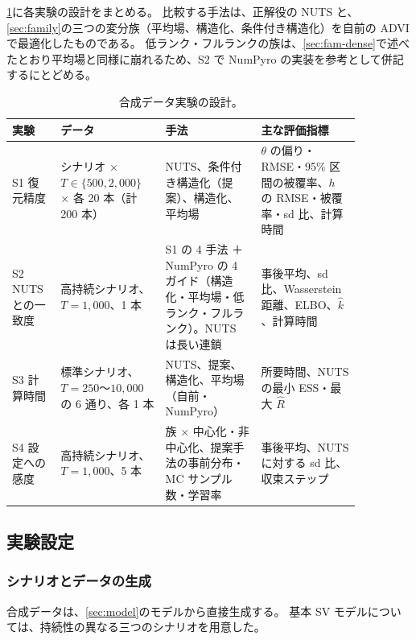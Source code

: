 \cref{tab:syn-design}に各実験の設計をまとめる。
比較する手法は、正解役の NUTS と、\cref{sec:family}の三つの変分族（平均場、構造化、条件付き構造化）を自前の ADVI で最適化したものである。
低ランク・フルランクの族は、\cref{sec:fam-dense}で述べたとおり平均場と同様に崩れるため、S2 で NumPyro の実装を参考として併記するにとどめる。

\begin{table}[tbp]
  \centering
  \caption{合成データ実験の設計。}
  \label{tab:syn-design}
  \footnotesize
  \begin{tabular}{>{\raggedright\arraybackslash}p{0.12\linewidth}>{\raggedright\arraybackslash}p{0.25\linewidth}>{\raggedright\arraybackslash}p{0.24\linewidth}>{\raggedright\arraybackslash}p{0.25\linewidth}}
    \toprule
    実験 & データ & 手法 & 主な評価指標 \\
    \midrule
    S1 復元精度 & 5 シナリオ × $T \in \{500, 2{,}000\}$ × 各 20 本（計 200 本） & NUTS、条件付き構造化（提案）、構造化、平均場 & $\theta$ の偏り・RMSE・95\% 区間の被覆率、$h$ の RMSE・被覆率・sd 比、計算時間 \\
    \addlinespace
    S2 NUTS との一致度 & 高持続シナリオ、$T = 1{,}000$、1 本 & S1 の 4 手法 ＋ NumPyro の 4 ガイド（構造化・平均場・低ランク・フルランク）。NUTS は長い連鎖 & 事後平均、sd 比、Wasserstein 距離、ELBO、$\hat k$、計算時間 \\
    \addlinespace
    S3 計算時間 & 標準シナリオ、$T = 250$〜$10{,}000$ の 6 通り、各 1 本 & NUTS、提案、構造化、平均場（自前・NumPyro） & 所要時間、NUTS の最小 ESS・最大 $\hat R$ \\
    \addlinespace
    S4 設定への感度 & 高持続シナリオ、$T = 1{,}000$、5 本 & 3 族 × 中心化・非中心化、提案手法の事前分布・MC サンプル数・学習率 & 事後平均、NUTS に対する sd 比、収束ステップ \\
    \bottomrule
  \end{tabular}
\end{table}

\subsection{実験設定}\label{sec:syn-setup}

\subsubsection{シナリオとデータの生成}

合成データは、\cref{sec:model}のモデルから直接生成する。
基本 SV モデルについては、持続性の異なる三つのシナリオを用意した。

